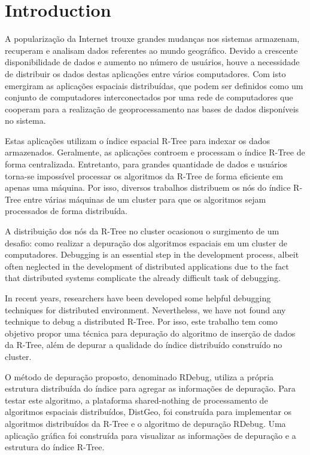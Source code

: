 \section{Introduction}
\label{sec:intro}

A popularização da Internet trouxe grandes mudanças nos sistemas armazenam, recuperam e analisam dados referentes ao mundo
geográfico. Devido a crescente disponibilidade de dados e aumento no número de
usuários, houve a necessidade de distribuir os dados destas aplicações entre vários computadores. 
Com isto emergiram as aplicações espaciais distribuídas, que podem ser definidos como um conjunto de computadores interconectados por uma rede de computadores que cooperam para a realização de geoprocessamento nas bases de dados disponíveis no sistema.

Estas aplicações utilizam o índice espacial R-Tree para indexar os dados armazenados. Geralmente, as aplicações controem e processam o índice R-Tree de forma centralizada. Entretanto, para grandes quantidade de dados e usuários torna-se impossível processar os algoritmos da R-Tree de forma eficiente em apenas uma máquina. Por isso, diversos trabalhos \cite{an1999storing,du2007sd,schnitzer1999master,wei2008new,koudas1996declustering,dedsi,zhang2009spatial,zhong2012towards} distribuem os nós do índice R-Tree entre várias máquinas de um cluster para que os algoritmos sejam processados de forma distribuída.

A distribuição dos nós da R-Tree no cluster ocasionou o surgimento de um desafio: como realizar a depuração dos algoritmos espaciais em um cluster de computadores. Debugging is an essential step in the development process, albeit often neglected in the development of distributed applications due to the fact that distributed systems complicate the already difficult task of debugging.

In recent years, researchers have been developed some helpful debugging techniques for distributed environment. Nevertheless, we have not found any technique to debug a distributed R-Tree. Por isso, este trabalho tem como objetivo propor uma técnica para depuração do algoritmo de inserção de dados da R-Tree, além de depurar a qualidade do índice distribuído construído no cluster. 

O método de depuração proposto, denominado RDebug, utiliza a própria estrutura distribuída do índice para agregar as informações de depuração. Para testar este algoritmo, a plataforma shared-nothing de processamento de algoritmos espaciais distribuídos, DistGeo, foi construída para implementar os algoritmos distribuídos da R-Tree e o algoritmo de depuração RDebug. Uma aplicação gráfica foi construída para visualizar as informações de depuração e a estrutura do índice R-Tree. 

